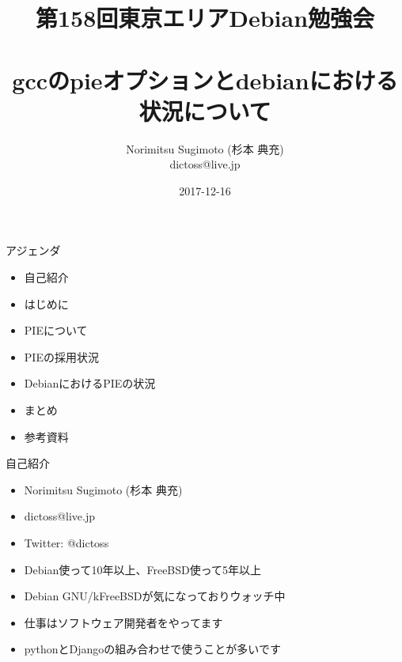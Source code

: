 \title{第158回東京エリアDebian勉強会 \\　\\gccのpieオプションとdebianにおける状況について}
\subtitle{}
\author{Norimitsu Sugimoto (杉本 典充) \\dictoss@live.jp}
\date{2017-12-16}



\frame{\titlepage{}}


\begin{frame}{アジェンダ}
  \begin{itemize}
  \item 自己紹介
  \item はじめに
  \item PIEについて
  \item PIEの採用状況
  \item DebianにおけるPIEの状況
  \item まとめ
  \item 参考資料
  \end{itemize}
\end{frame}


\begin{frame}{自己紹介}
  \begin{itemize}
  \item Norimitsu Sugimoto (杉本 典充)
  \item dictoss@live.jp
  \item Twitter: @dictoss
  \item Debian使って10年以上、FreeBSD使って5年以上
  \item Debian GNU/kFreeBSDが気になっておりウォッチ中
  \item 仕事はソフトウェア開発者をやってます
  \item pythonとDjangoの組み合わせで使うことが多いです
  \end{itemize}
\end{frame}


